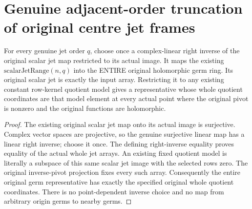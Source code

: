 \section{Genuine adjacent-order truncation of original centre jet frames}

\begin{definition}
\label{hir:actual-fixed-entire-scalar-jet-representatives}
For every genuine jet order $q$, choose once a complex-linear right
inverse of the original scalar jet map restricted to its actual image.
It maps the existing $\mathrm{scalarJetRange}(n,q)$ into the ENTIRE
original holomorphic germ ring. Its original scalar jet is exactly
the input array. Restricting it to any existing constant row-kernel
quotient model gives a representative whose whole quotient coordinates
are that model element at every actual point where the original pivot
is nonzero and the original functions are holomorphic.
\leanok
\end{definition}
\begin{proof}
The existing original scalar jet map onto its actual image is
surjective. Complex vector spaces are projective, so the genuine
surjective linear map has a linear right inverse; choose it once.
The defining right-inverse equality proves equality of the actual
whole jet arrays. An existing fixed quotient model is literally a
subspace of this same scalar jet image with the selected rows zero.
The original inverse-pivot projection fixes every such array.
Consequently the entire original germ representative has exactly
the specified original whole quotient coordinates. There is no
point-dependent inverse choice and no map from arbitrary origin
germs to nearby germs.
\end{proof}

